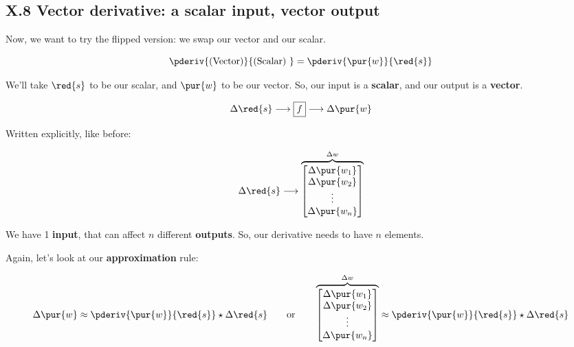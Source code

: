     \subsection*{X.8 \quad Vector derivative: a scalar input, vector output}
    
        Now, we want to try the flipped version: we swap our vector and our scalar.
        
        \begin{equation}
            \pderiv{ \text{(Vector)} } { \text{(Scalar) } }
            =
            \pderiv{ \pur{w} }{ \red{s} } 
        \end{equation}
        
        We'll take $\red{s}$ to be our scalar, and $\pur{w}$ to be our vector. So, our input is a \textbf{scalar}, and our output is a \textbf{vector}.
        
        \begin{equation}
            \Delta \red{s}
            \longrightarrow
            \boxed{f}
            \longrightarrow
            \Delta \pur{w}
        \end{equation}
        
        Written explicitly, like before:
        
        \begin{equation}
            \Delta \red{s}
            \longrightarrow 
            \overbrace{
                \begin{bmatrix}
                    \Delta \pur{w_1}\\ \Delta \pur{w_2}\\ \vdots \\ \Delta \pur{w_n}
                \end{bmatrix}
            }^{\Delta w}
        \end{equation}
        
        We have 1 \textbf{input}, that can affect $n$ different \textbf{outputs}. So, our derivative needs to have $n$ elements.
        
        Again, let's look at our \textbf{approximation} rule:
        
        \begin{equation}
            \Delta \pur{w}
            \approx
            \pderiv{ \pur{w} }{ \red{s} }  
            \star
            \Delta \red{s}
                \qquad
                \text{or}
                \qquad
            \overbrace{
                \begin{bmatrix}
                    \Delta \pur{w_1}\\ \Delta \pur{w_2}\\ \vdots \\ \Delta \pur{w_n}
                \end{bmatrix}
            }^{\Delta w}
            \approx
            \pderiv{ \pur{w} }{ \red{s} } 
            \star
            \Delta \red{s}
        \end{equation}
        
